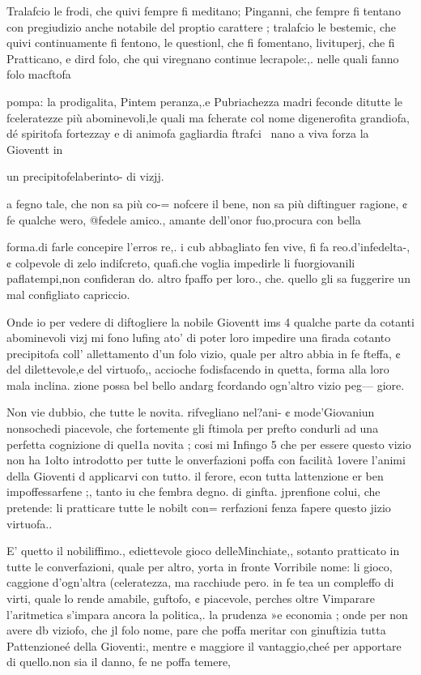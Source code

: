 \documentclass[12pt,a6paper]{article}
\begin{document}
Tralafcio le frodi, che quivi
fempre fi meditano; Pinganni,
che fempre fi tentano con pregiudizio anche notabile del proptio carattere ; tralafcio le bestemic, che quivi continuamente fi fentono, le questionl, che fi
fomentano, livituperj, che fi
Pratticano, e dird folo, che qui
viregnano continue lecrapole:,.
nelle quali fanno folo macftofa

pompa: la prodigalita, Pintem
peranza,.e Pubriachezza madri
feconde ditutte le fceleratezze
più abominevoli,le quali ma
fcherate col nome digenerofita
grandiofa, dé spiritofa fortezzay
e di animofa gagliardia ftrafci~
nano a viva forza la Gioventt in

un precipitofelaberinto- di vizjj.

a fegno tale, che non sa più co-=
nofcere il bene, non sa più diftinguer ragione, ¢ fe qualche
wero, @fedele amico., amante
dell’onor fuo,procura con bella

forma.di farle concepire l’erros
re,. i cub abbagliato fen vive,
fi fa reo.d’infedelta-, ¢ colpevole di zelo indifcreto, quafi.che
voglia impedirle li fuorgiovanili paflatempi,non confideran
do. altro fpaffo per loro., che.
quello gli sa fuggerire un mal
configliato capriccio.

Onde io per vedere di diftogliere la nobile Gioventt ims 4
qualche parte da cotanti abominevoli vizj mi fono lufing ato’ di poter loro impedire una
firada cotanto precipitofa coll’
allettamento d’un folo vizio,
quale per altro abbia in fe fteffa,
¢ del dilettevole,e del virtuofo,,
accioche fodisfacendo in quetta,
forma alla loro mala inclina.
zione possa bel bello andarg
fcordando ogn’altro vizio peg—
giore.

Non vie dubbio, che tutte
le novita. rifvegliano nel?ani- ¢
mode’Giovaniun nonsochedi 
piacevole, che fortemente gli
ftimola per prefto condurli ad
una perfetta cognizione di quel1a novita ; cosi mi Infingo 5 che
per essere questo vizio non ha
1olto introdotto per tutte le
onverfazioni poffa con facilità
1overe l’animi della Gioventi
d applicarvi con tutto. il ferore, econ tutta lattenzione
er ben impoffessarfene ;, tanto
iu che fembra degno. di ginfta.
jprenfione colui, che pretende:
li pratticare tutte le nobilt con=
rerfazioni fenza fapere questo
jizio virtuofa..

E’ quetto il nobiliffimo., ediettevole gioco delleMinchiate,,
sotanto pratticato in tutte le
converfazioni, quale per altro,
yorta in fronte Vorribile nome:
li gioco, caggione d’ogn’altra
(celeratezza, ma racchiude pero. in fe tea un compleffo di
virti, quale lo rende amabile,
guftofo, ¢ piacevole, perches
oltre Vimparare l’aritmetica
s'impara ancora la politica,. la
prudenza »e economia ; onde
per non avere db viziofo, che jl
folo nome, pare che poffa meritar con ginuftizia tutta Pattenzioneé della Gioventi:, mentre
e maggiore il vantaggio,cheé
per apportare di quello.non sia
il danno, fe ne poffa temere,
\end{document}
